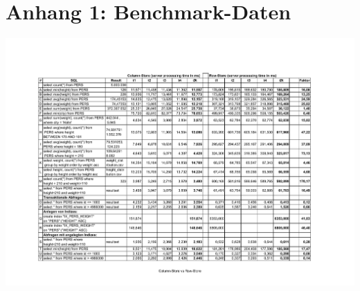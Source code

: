 \newpage
\thispagestyle{empty}

\section*{Anhang 1: Benchmark-Daten}

\includegraphics[width=1.5\textwidth, angle=90]{Anhang/Column-Store-vs-Row-Store.pdf}
